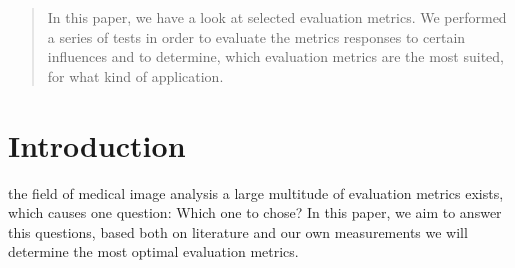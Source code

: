 \documentclass[journal]{IEEEtran}
\begin{document}







\maketitle

\begin{abstract}
In this paper, we have a look at selected evaluation metrics. We performed a series of tests in order to evaluate the metrics responses to certain influences and to determine, which evaluation metrics are the most suited, for what kind of application. 
\end{abstract}








%
\IEEEpeerreviewmaketitle



\section{Introduction}
\label{Introduction}
% 
% 
% 
% 
 the field of medical image analysis a large multitude of evaluation metrics exists, which causes one question: Which one to chose? In this paper, we aim to answer this questions, based both on literature and our own measurements we will determine the most optimal evaluation metrics.
\end{document}
